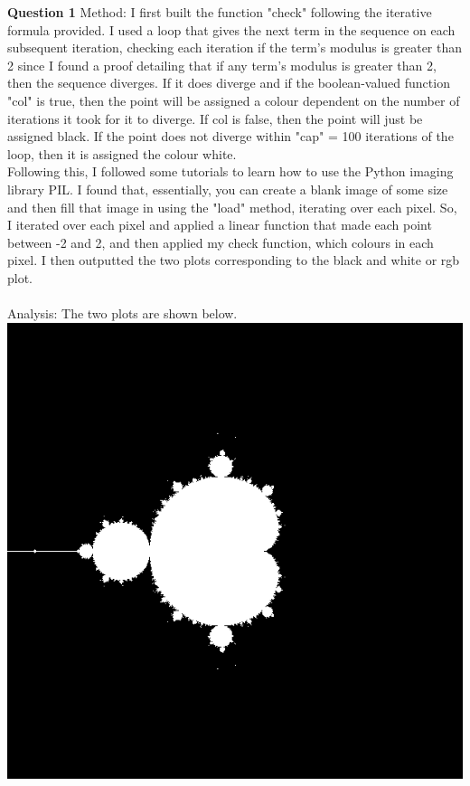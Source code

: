 \documentclass[11pt]{article}
\begin{document}
{\textbf{Question 1}}
Method: I first built the function "check" following the iterative formula
provided. I used a loop that gives the next term in the sequence on each
subsequent iteration, checking each iteration if the term's modulus is
greater than 2 since I found a proof detailing that if any term's modulus
is greater than 2, then the sequence diverges. If it does diverge and
if the boolean-valued function "col" is true, then the point will be
assigned a colour dependent on the number of iterations it took for it to
diverge. If col is false, then the point will just be assigned black. If
the point does not diverge within "cap" = 100 iterations of the loop, then
it is assigned the colour white.\\
Following this, I followed some tutorials to learn how to use the
Python imaging library PIL. I found that, essentially, you can
create a blank image of some size and then fill that image in using the
"load" method, iterating over each pixel. So, I iterated over each pixel
and applied a linear function that made each point between -2 and 2, and then
applied my check function, which colours in each pixel. I then outputted
the two plots corresponding to the black and white or rgb plot.\\
\\
Analysis: The two plots are shown below.\\
\includegraphics[scale = 0.5]{plot_bw.png}\\
\end{document}
